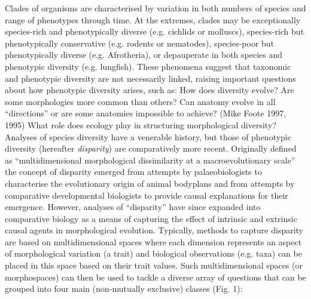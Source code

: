 \documentclass[12pt,letterpaper]{article}
\begin{document}
\noindent Clades of organisms are characterised by variation in both numbers of species and range of phenotypes through time.
At the extremes, clades may be exceptionally species-rich and phenotypically diverse (e.g. cichlids or molluscs), species-rich but phenotypically conservative (e.g. rodents or nematodes), species-poor but phenotypically diverse (e.g. Afrotheria), %
or depauperate in both species and phenotypic diversity (e.g. lungfish).
These phenomena suggest that taxonomic and phenotypic diversity are not necessarily linked, raising important questions about how phenotypic diversity arises, such as:
How does diversity evolve?
Are some morphologies more common than others?
Can anatomy evolve in all ``directions'' or are some anatomies impossible to achieve? (Mike Foote 1997, 1995) %
What role does ecology play in structuring morphological diversity?
Analyses of species diversity have a venerable history, but those of phenotypic diversity (hereafter \emph{disparity}) are comparatively more recent. 
Originally defined as ``multidimensional morphological dissimilarity at a macroevolutionary scale'' \citep{runnegar1987rates,Gould1991-nh} the concept of disparity emerged from attempts by palaeobiologists to characterise the evolutionary origin of animal bodyplans and from attempts by comparative developmental biologists to provide causal explanations for their emergence.
However, analyses of ``disparity'' have since expanded into comparative biology as a means of capturing the effect of intrinsic and extrinsic causal agents in morphological evolution.
Typically, methods to capture disparity are based on multidimensional spaces where each dimension represents an aspect of morphological variation (a trait) and biological observations (e.g. taxa) can be placed in this space based on their trait values.
Such multidimensional spaces (or morphospaces) can then be used to tackle a diverse array of questions that can be grouped into four main (non-mutually exclusive) classes (Fig. 1):
\end{document}
